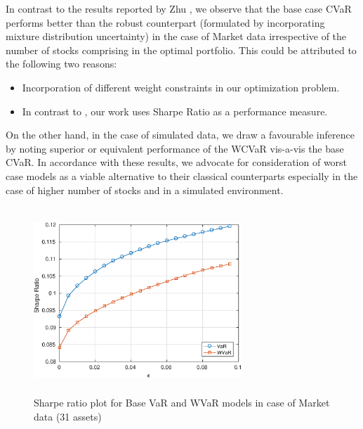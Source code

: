 \documentclass[12pt]{article}
\numberwithin{equation}{section}
\begin{document}
In contrast to the results reported by Zhu \cite{zhu}, we observe that the base case CVaR performs better than the robust counterpart (formulated by incorporating mixture distribution uncertainty) in the case of Market data irrespective of the number of stocks comprising in the optimal portfolio. This could be attributed to the following two reasons:
\begin{itemize}
\item Incorporation of different weight constraints in our optimization problem.
\item In contrast to \cite{zhu}, our work uses Sharpe Ratio as a performance measure.
\end{itemize}
On the other hand, in the case of simulated data, we draw a favourable inference by noting superior or equivalent performance of the WCVaR vis-a-vis the base CVaR. In accordance with these results, we advocate for consideration of worst case models as a viable alternative to their classical counterparts especially in the case of higher number of stocks and in a simulated environment.




\clearpage
\newpage

\begin{figure}[!h]
\centering
\includegraphics[height=7.0cm,width=0.7\textwidth]{VaR/bse30_market/sr_cheb.eps}
\caption{Sharpe ratio plot for Base VaR and WVaR models in case of Market data (31 assets)}
\label{fig:5.1}
\end{figure}
\end{document}
